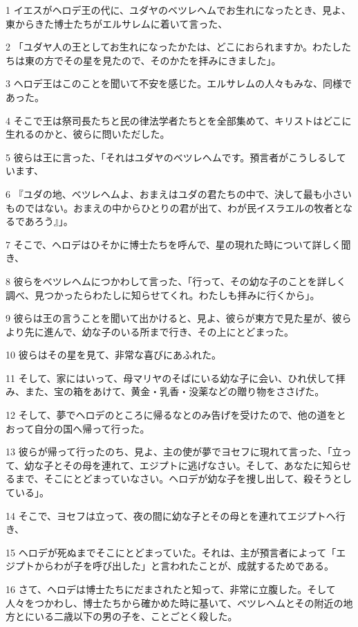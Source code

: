 \par 1 イエスがヘロデ王の代に、ユダヤのベツレヘムでお生れになったとき、見よ、東からきた博士たちがエルサレムに着いて言った、
\par 2 「ユダヤ人の王としてお生れになったかたは、どこにおられますか。わたしたちは東の方でその星を見たので、そのかたを拝みにきました」。
\par 3 ヘロデ王はこのことを聞いて不安を感じた。エルサレムの人々もみな、同様であった。
\par 4 そこで王は祭司長たちと民の律法学者たちとを全部集めて、キリストはどこに生れるのかと、彼らに問いただした。
\par 5 彼らは王に言った、「それはユダヤのベツレヘムです。預言者がこうしるしています、
\par 6 『ユダの地、ベツレヘムよ、おまえはユダの君たちの中で、決して最も小さいものではない。おまえの中からひとりの君が出て、わが民イスラエルの牧者となるであろう』」。
\par 7 そこで、ヘロデはひそかに博士たちを呼んで、星の現れた時について詳しく聞き、
\par 8 彼らをベツレヘムにつかわして言った、「行って、その幼な子のことを詳しく調べ、見つかったらわたしに知らせてくれ。わたしも拝みに行くから」。
\par 9 彼らは王の言うことを聞いて出かけると、見よ、彼らが東方で見た星が、彼らより先に進んで、幼な子のいる所まで行き、その上にとどまった。
\par 10 彼らはその星を見て、非常な喜びにあふれた。
\par 11 そして、家にはいって、母マリヤのそばにいる幼な子に会い、ひれ伏して拝み、また、宝の箱をあけて、黄金・乳香・没薬などの贈り物をささげた。
\par 12 そして、夢でヘロデのところに帰るなとのみ告げを受けたので、他の道をとおって自分の国へ帰って行った。
\par 13 彼らが帰って行ったのち、見よ、主の使が夢でヨセフに現れて言った、「立って、幼な子とその母を連れて、エジプトに逃げなさい。そして、あなたに知らせるまで、そこにとどまっていなさい。ヘロデが幼な子を捜し出して、殺そうとしている」。
\par 14 そこで、ヨセフは立って、夜の間に幼な子とその母とを連れてエジプトへ行き、
\par 15 ヘロデが死ぬまでそこにとどまっていた。それは、主が預言者によって「エジプトからわが子を呼び出した」と言われたことが、成就するためである。
\par 16 さて、ヘロデは博士たちにだまされたと知って、非常に立腹した。そして人々をつかわし、博士たちから確かめた時に基いて、ベツレヘムとその附近の地方とにいる二歳以下の男の子を、ことごとく殺した。
